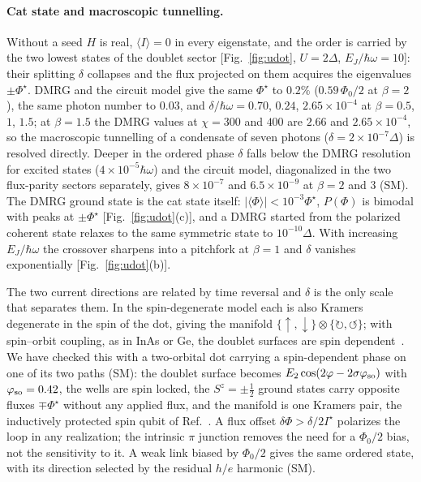 \paragraph*{Cat state and macroscopic tunnelling.}
Without a seed $H$ is real, $\langle I\rangle=0$ in every eigenstate, and the order is carried by the two
lowest states of the doublet sector [Fig.~\ref{fig:udot}, $U=2\Delta$, $E_J/\hbar\omega=10$]: their
splitting $\delta$ collapses and the flux projected on them acquires the eigenvalues $\pm\Phi^\star$. DMRG
and the circuit model give the same $\Phi^\star$ to $0.2\%$ ($0.59\,\Phi_0/2$ at $\beta=2$), the same photon
number to $0.03$, and $\delta/\hbar\omega=0.70$, $0.24$, $2.65\times10^{-4}$ at $\beta=0.5$, $1$, $1.5$; at
$\beta=1.5$ the DMRG values at $\chi=300$ and $400$ are $2.66$ and $2.65\times10^{-4}$, so the macroscopic
tunnelling of a condensate of seven photons ($\delta=2\times10^{-7}\Delta$) is resolved directly. Deeper in
the ordered phase $\delta$ falls below the DMRG resolution for excited states ($4\times10^{-5}\hbar\omega$) and
the circuit model, diagonalized in the two flux-parity sectors separately, gives $8\times10^{-7}$ and
$6.5\times10^{-9}$ at $\beta=2$ and $3$ (SM). The DMRG ground state is the cat state itself:
$|\langle\Phi\rangle|<10^{-3}\Phi^\star$, $P(\Phi)$ is bimodal with peaks at $\pm\Phi^\star$
[Fig.~\ref{fig:udot}(c)], and a DMRG started from the polarized coherent state relaxes to the same symmetric
state to $10^{-10}\Delta$. With increasing $E_J/\hbar\omega$ the crossover sharpens into a pitchfork at
$\beta=1$ and $\delta$ vanishes exponentially [Fig.~\ref{fig:udot}(b)].

The two current directions are related by time reversal and $\delta$ is the only scale that separates
them. In the spin-degenerate model each is also Kramers degenerate in the spin of the dot, giving the
manifold $\{\uparrow,\downarrow\}\otimes\{\circlearrowright,\circlearrowleft\}$; with spin--orbit coupling,
as in InAs or Ge, the doublet surfaces are spin dependent~\cite{Padurariu2010,Tosi2019,Hays2021}. We have
checked this with a two-orbital dot carrying a spin-dependent phase on one of its two paths (SM): the doublet
surface becomes $E_2\cos(2\varphi-2\sigma\varphi_{\rm so})$ with $\varphi_{\rm so}=0.42$, the wells are spin
locked, the $S^z=\pm\tfrac12$ ground states carry opposite fluxes $\mp\Phi^\star$ without any applied flux, and
the manifold is one Kramers pair, the inductively protected spin qubit of Ref.~\cite{delOlmo2026}.
A flux offset $\delta\Phi>\delta/2I^\star$ polarizes the loop in any realization; the intrinsic $\pi$
junction removes the need for a $\Phi_0/2$ bias, not the sensitivity to it. A weak link biased by $\Phi_0/2$
gives the same ordered state, with its direction selected by the residual $h/e$ harmonic (SM).

